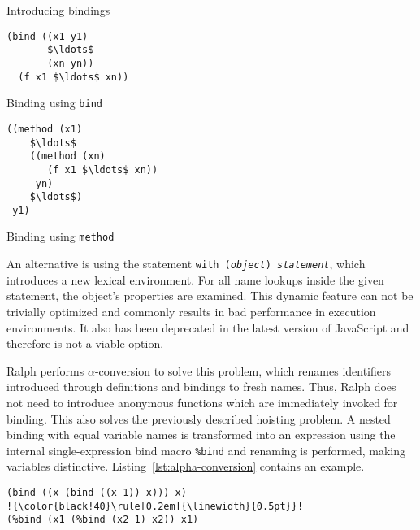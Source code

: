 \documentclass{acm_proc_article-sp}
\makeatletter
\newenvironment{sublisting}[2][]{%
\def\sf@one{#1}%
\def\sf@two{#2}%
\setbox\sf@box\hbox
\bgroup
}{%
\egroup
\ifx\@empty\sf@two\@empty\relax
\def\sf@two{\@empty}
\fi
\ifx\@empty\sf@one\@empty\relax
\subfloat[\sf@two]{\box\sf@box}%
\else
\subfloat[\sf@one][\sf@two]{\box\sf@box}%
\fi
}
\makeatother
\begin{document}
\begin{mylisting}[h]
  \caption{Introducing bindings}
  \label{lst:bindings}
  \vspace{-2em}
  \begin{sublisting}{Binding using \texttt{bind}}
    \begin{minipage}[b]{.42\textwidth}
      \begin{lstlisting}
(bind ((x1 y1)
       $\ldots$
       (xn yn))
  (f x1 $\ldots$ xn))
      \end{lstlisting}
    \end{minipage}
  \end{sublisting}
  \hfill
  \begin{sublisting}{Binding using \texttt{method}}
    \begin{minipage}[b]{.48\textwidth}
      \begin{lstlisting}
((method (x1)
    $\ldots$
    ((method (xn)
       (f x1 $\ldots$ xn))
     yn)
    $\ldots$)
 y1)
      \end{lstlisting}
    \end{minipage}
  \end{sublisting}
\end{mylisting}
\vspace{-0.5em}

An alternative is using the statement \sloppy\mbox{\texttt{with
    (\textit{object}) \textit{statement}}}, which introduces a new
lexical environment. For all name lookups inside the given statement,
the object's properties are examined. This dynamic feature can not be
trivially optimized and commonly results in bad performance in
execution environments. It also has been deprecated in the latest
version of JavaScript and therefore is not a viable option.

Ralph performs $\alpha$-conversion to solve this problem, which
renames identifiers introduced through definitions and bindings to
fresh names. Thus, Ralph does not need to introduce anonymous functions
which are immediately invoked for binding. This also solves the
previously described hoisting problem. A nested binding with equal
variable names is transformed into an expression using the internal
single-expression bind macro \texttt{\%bind} and renaming is
performed, making variables distinctive.
Listing~\ref{lst:alpha-conversion} contains an example.

\begin{lstlisting}[label=lst:alpha-conversion,
    caption=Expansion and alpha-conversion,escapechar=!
]
(bind ((x (bind ((x 1)) x))) x)
!{\color{black!40}\rule[0.2em]{\linewidth}{0.5pt}}!
(%bind (x1 (%bind (x2 1) x2)) x1)
\end{lstlisting}
\end{document}
